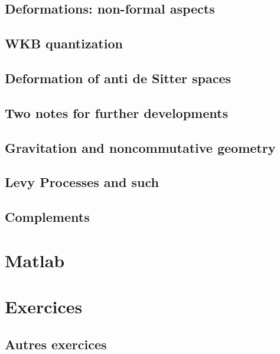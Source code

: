 \chapter{Deformations: non-formal aspects}


      

\chapter{WKB quantization}


\chapter{Deformation of anti de Sitter spaces}   \label{ChDefoBH}


\chapter{Two notes for further developments}        \label{ChapNoteDev}



\chapter{Gravitation and noncommutative geometry}


\chapter{Levy Processes and such}


\chapter{Complements}






\part{Matlab}


\part{Exercices} 

\chapter{Autres exercices}


